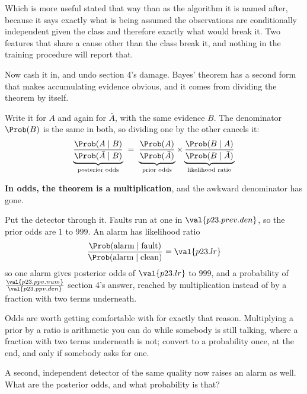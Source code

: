 \begin{fr}

Which is more useful stated that way than as the algorithm it is named after,
because it says exactly what is being assumed \dash{} the observations are
conditionally independent given the class \dash{} and therefore exactly what
would break it. Two features that share a cause other than the class break it,
and nothing in the training procedure will report that.

Now cash it in, and undo section 4's damage. Bayes' theorem has a second form
that makes accumulating evidence obvious, and it comes from dividing the
theorem by itself.

Write it for $A$ and again for $\bar{A}$, with the same evidence $B$. The
denominator $\Prob(B)$ is the same in both, so dividing one by the other
cancels it:
\[ \underbrace{\frac{\Prob(A \mid B)}{\Prob(\bar{A} \mid B)}}_{\text{posterior odds}}
   \;=\;
   \underbrace{\frac{\Prob(A)}{\Prob(\bar{A})}}_{\text{prior odds}}
   \times
   \underbrace{\frac{\Prob(B \mid A)}{\Prob(B \mid \bar{A})}}_{\text{likelihood ratio}} \]

\textbf{In odds, the theorem is a multiplication}, and the awkward denominator
has gone.
\end{fr}

\begin{fr}
Put the detector through it. Faults run at one in $\val{p23.prev.den}$, so the
prior odds are $1$ to $999$. An alarm has likelihood ratio
\[ \frac{\Prob(\text{alarm} \mid \text{fault})}
        {\Prob(\text{alarm} \mid \text{clean})} = \val{p23.lr} \]
so one alarm gives posterior odds of $\val{p23.lr}$ to $999$, and a probability
of $\frac{\val{p23.ppv.num}}{\val{p23.ppv.den}}$ \dash{} section 4's answer,
reached by multiplication instead of by a fraction with two terms underneath.

Odds are worth getting comfortable with for exactly that reason. Multiplying a
prior by a ratio is arithmetic you can do while somebody is still talking,
where a fraction with two terms underneath is not; convert to a probability
once, at the end, and only if somebody asks for one.

A second, independent detector of the same quality now raises an alarm as well.
What are the posterior odds, and what probability is that?
\dotline
\nextframe
\end{fr}

